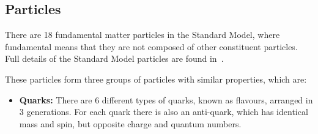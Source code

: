 \subsection{Particles}
\label{sec:theo-sm_particles}

There are 18 fundamental matter particles in the Standard Model,
where fundamental means that they are not composed of other constituent particles.
Full details of the Standard Model particles are found in~\cite{obj-bjets_PDG}.

\noindent
These particles form three groups of particles with similar properties, which are:

\begin{itemize}[leftmargin=*]
\item\textbf{Quarks:}
  There are 6 different types of quarks, known as flavours, arranged in 3 generations.
  For each quark there is also an anti-quark, which has identical mass and spin, but opposite charge and quantum numbers.  \vspace{1em}
  


\end{itemize}
